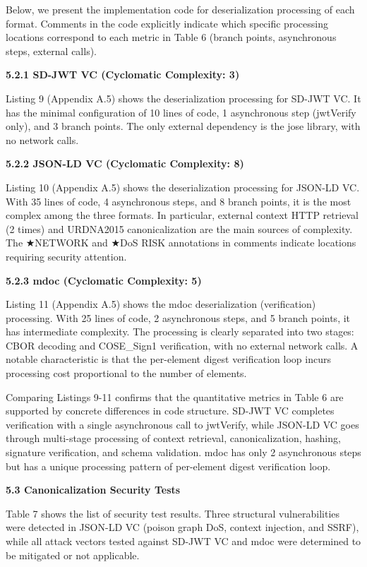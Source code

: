 Below, we present the implementation code for deserialization processing of each format. Comments in the code explicitly indicate which specific processing locations correspond to each metric in Table 6 (branch points, asynchronous steps, external calls).

\textbf{5.2.1 SD-JWT VC (Cyclomatic Complexity: 3)}

Listing 9 (Appendix A.5) shows the deserialization processing for SD-JWT VC. It has the minimal configuration of 10 lines of code, 1 asynchronous step (jwtVerify only), and 3 branch points. The only external dependency is the jose library, with no network calls.

\textbf{5.2.2 JSON-LD VC (Cyclomatic Complexity: 8)}

Listing 10 (Appendix A.5) shows the deserialization processing for JSON-LD VC. With 35 lines of code, 4 asynchronous steps, and 8 branch points, it is the most complex among the three formats. In particular, external context HTTP retrieval (2 times) and URDNA2015 canonicalization are the main sources of complexity. The ★NETWORK and ★DoS RISK annotations in comments indicate locations requiring security attention.

\textbf{5.2.3 mdoc (Cyclomatic Complexity: 5)}

Listing 11 (Appendix A.5) shows the mdoc deserialization (verification) processing. With 25 lines of code, 2 asynchronous steps, and 5 branch points, it has intermediate complexity. The processing is clearly separated into two stages: CBOR decoding and COSE\_Sign1 verification, with no external network calls. A notable characteristic is that the per-element digest verification loop incurs processing cost proportional to the number of elements.

Comparing Listings 9-11 confirms that the quantitative metrics in Table 6 are supported by concrete differences in code structure. SD-JWT VC completes verification with a single asynchronous call to jwtVerify, while JSON-LD VC goes through multi-stage processing of context retrieval, canonicalization, hashing, signature verification, and schema validation. mdoc has only 2 asynchronous steps but has a unique processing pattern of per-element digest verification loop.

\textbf{5.3 Canonicalization Security Tests}

Table 7 shows the list of security test results. Three structural vulnerabilities were detected in JSON-LD VC (poison graph DoS, context injection, and SSRF), while all attack vectors tested against SD-JWT VC and mdoc were determined to be mitigated or not applicable.


